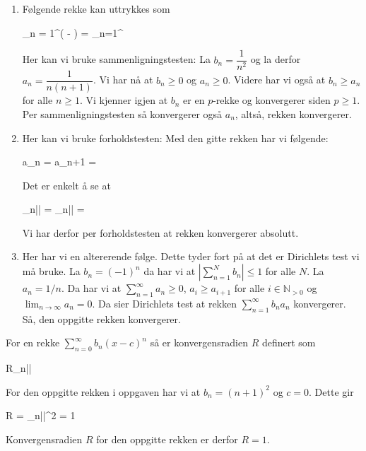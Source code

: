 \oppgave
\deloppgave
\begin{enumerate}
	\item Følgende rekke kan uttrykkes som
	\begin{likning}
		\sum_{n = 1}^\infty \left( - \right) = \sum_{n=1}^\infty {}
	\end{likning}
	Her kan vi bruke sammenligningstesten: La $b_n = \dfrac{1}{n^2}$ og la derfor $a_n = \dfrac{1}{n(n+1)}$. Vi har nå at $b_n \geq 0$ og $a_n \geq 0$. Videre har vi også at $b_n \geq a_n$ for alle $n \geq 1$. Vi kjenner igjen at $b_n$ er en $p$-rekke og konvergerer siden $p \geq 1$. Per sammenligningstesten så konvergerer også $a_n$, altså, rekken konvergerer.
	
	\item Her kan vi bruke forholdstesten: Med den gitte rekken har vi følgende:
	\begin{likning}
		a_n =  \implies a_{n+1} = \frac{1}{2^{n+1}} 
	\end{likning}
	Det er enkelt å se at
	\begin{likning}
		\lim_{n\to\infty}\left|\right| = \lim_{n\to\infty}\left|\right| = \frac{1}{2}
	\end{likning}
	Vi har derfor per forholdstesten at rekken konvergerer absolutt.
	
	\item Her har vi en altererende følge. Dette tyder fort på at det er Dirichlets test vi må bruke. La $b_n = (-1)^n$ da har vi at $\left|\sum_{n = 1}^N b_n\right| \leq 1$ for alle $N$. La $a_n = 1/n$. Da har vi at $\sum_{n = 1}^{\infty} a_n \geq 0$, $a_i \geq a_{i+1}$ for alle $i\in\mathbb{N}_{>0}$ og $\lim_{n\to\infty} a_n = 0$. Da sier Dirichlets test at rekken $\sum_{n=1}^\infty b_na_n$ konvergerer. Så, den oppgitte rekken konvergerer.
\end{enumerate}

\deloppgave
For en rekke $\sum_{n=0}^\infty b_n(x-c)^n$ så er konvergensradien $R$ definert som
\begin{likning}
	R\equiv \lim_{n\to\infty}\left|\right|
\end{likning}
For den oppgitte rekken i oppgaven har vi at $b_n = (n+1)^2$ og $c = 0$. Dette gir
\begin{likning}
	R = \lim_{n\to\infty}\left|\right|^2 = 1
\end{likning}
Konvergensradien $R$ for den oppgitte rekken er derfor $R = 1$.

